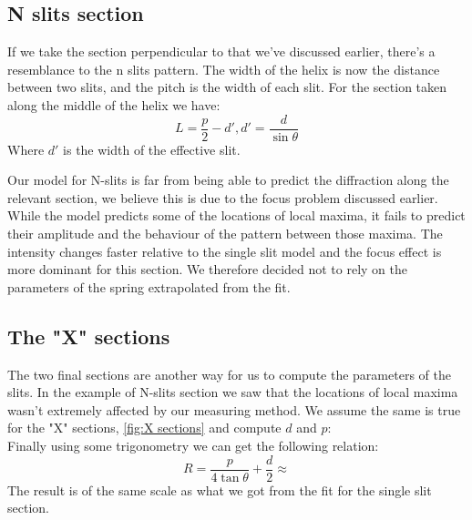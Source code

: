 \subsection{N slits section}
If we take the section perpendicular to that we've discussed earlier, there's a resemblance to the n slits pattern.
The width of the helix is now the distance between two slits, and the pitch is the width of each slit.
For the section taken along the middle of the helix we have: \[L=\frac{p}{2}-d',d'=\frac{d}{\sin \theta}\]
Where $d'$ is the width of the effective slit.

Our model for N-slits is far from being able to predict the diffraction along the relevant section, we believe this is due to the focus problem discussed earlier.
While the model predicts some of the locations of local maxima, it fails to predict their amplitude and the behaviour of the pattern between those maxima.
The intensity changes faster relative to the single slit model and the focus effect is more dominant for this section.
We therefore decided not to rely on the parameters of the spring extrapolated from the fit.

\subsection{The "X" sections}
The two final sections are another way for us to compute the parameters of the slits.
In the example of N-slits section we saw that the locations of local maxima wasn't extremely affected by our measuring method.
We assume the same is true for the "X" sections, \ref{fig:X sections} and compute $d$ and $p$:
\[\]
Finally using some trigonometry we can get the following relation:
\[R=\frac{p}{4\tan \theta}+\frac{d}{2}\approx \]
The result is of the same scale as what we got from the fit for the single slit section.

